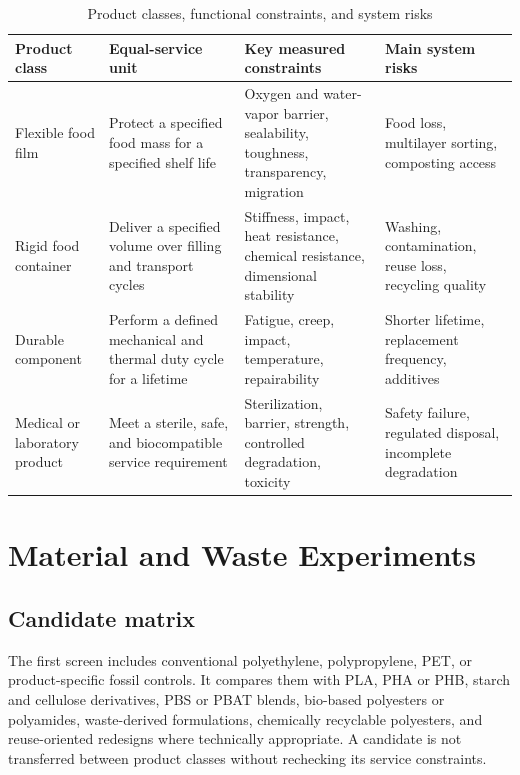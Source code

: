 \documentclass[conference]{IEEEtran}
\begin{document}
\begin{table}[t]
\caption{Product classes, functional constraints, and system risks}
\label{tab:functions}
\centering
\footnotesize
\setlength{\tabcolsep}{3pt}
\begin{tabular}{p{}p{}p{}p{}}
\toprule
Product class & Equal-service unit & Key measured constraints & Main system risks\\
\midrule
Flexible food film & Protect a specified food mass for a specified shelf life & Oxygen and water-vapor barrier, sealability, toughness, transparency, migration & Food loss, multilayer sorting, composting access\\
Rigid food container & Deliver a specified volume over filling and transport cycles & Stiffness, impact, heat resistance, chemical resistance, dimensional stability & Washing, contamination, reuse loss, recycling quality\\
Durable component & Perform a defined mechanical and thermal duty cycle for a lifetime & Fatigue, creep, impact, temperature, repairability & Shorter lifetime, replacement frequency, additives\\
Medical or laboratory product & Meet a sterile, safe, and biocompatible service requirement & Sterilization, barrier, strength, controlled degradation, toxicity & Safety failure, regulated disposal, incomplete degradation\\
\bottomrule
\end{tabular}
\end{table}

\section{Material and Waste Experiments}

\subsection{Candidate matrix}

The first screen includes conventional polyethylene, polypropylene, PET, or product-specific fossil controls. It compares them with PLA, PHA or PHB, starch and cellulose derivatives, PBS or PBAT blends, bio-based polyesters or polyamides, waste-derived formulations, chemically recyclable polyesters, and reuse-oriented redesigns where technically appropriate. A candidate is not transferred between product classes without rechecking its service constraints.
\end{document}
